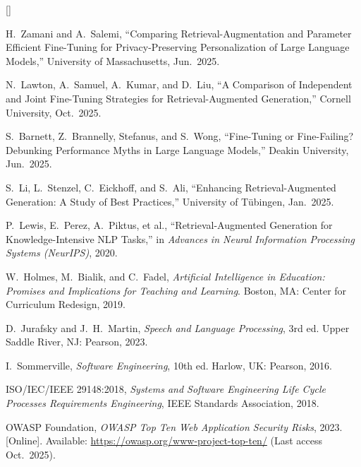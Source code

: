 \documentclass[12pt, a4paper, oneside]{report}
\begin{document}
\begin{list}{[]}{\setlength{\leftmargin}{2.5em}\setlength{\itemsep}{6pt}}

  \item H.\ Zamani and A.\ Salemi, ``Comparing Retrieval-Augmentation and Parameter Efficient Fine-Tuning for Privacy-Preserving Personalization of Large Language Models,'' University of Massachusetts, Jun.\ 2025.

  \item N.\ Lawton, A.\ Samuel, A.\ Kumar, and D.\ Liu, ``A Comparison of Independent and Joint Fine-Tuning Strategies for Retrieval-Augmented Generation,'' Cornell University, Oct.\ 2025.

  \item S.\ Barnett, Z.\ Brannelly, Stefanus, and S.\ Wong, ``Fine-Tuning or Fine-Failing? Debunking Performance Myths in Large Language Models,'' Deakin University, Jun.\ 2025.

  \item S.\ Li, L.\ Stenzel, C.\ Eickhoff, and S.\ Ali, ``Enhancing Retrieval-Augmented Generation: A Study of Best Practices,'' University of T\"{u}bingen, Jan.\ 2025.

  \item P.\ Lewis, E.\ Perez, A.\ Piktus, et al., ``Retrieval-Augmented Generation for Knowledge-Intensive NLP Tasks,'' in \textit{Advances in Neural Information Processing Systems (NeurIPS)}, 2020.

  \item W.\ Holmes, M.\ Bialik, and C.\ Fadel, \textit{Artificial Intelligence in Education: Promises and Implications for Teaching and Learning}. Boston, MA: Center for Curriculum Redesign, 2019.

  \item D.\ Jurafsky and J.\ H.\ Martin, \textit{Speech and Language Processing}, 3rd ed. Upper Saddle River, NJ: Pearson, 2023.

  \item I.\ Sommerville, \textit{Software Engineering}, 10th ed. Harlow, UK: Pearson, 2016.

  \item ISO/IEC/IEEE 29148:2018, \textit{Systems and Software Engineering Life Cycle Processes Requirements Engineering}, IEEE Standards Association, 2018.

  \item OWASP Foundation, \textit{OWASP Top Ten Web Application Security Risks}, 2023. [Online]. Available: \url{https://owasp.org/www-project-top-ten/} (Last access Oct.\ 2025).


\end{list}
\end{document}

